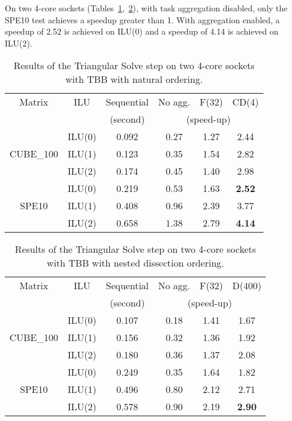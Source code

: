 On two 4-core sockets
(Tables~\ref{tab:tbb:8:solve:no},~\ref{tab:tbb:8:solve:nested}), with
task aggregation disabled, only the SPE10 test achieves a speedup
greater than 1. With aggregation enabled, a speedup of 2.52 is
achieved on ILU(0) and a speedup of 4.14 is achieved on ILU(2).

\begin{table}[!h]
  \renewcommand{\arraystretch}{1.3}
  \caption{Results of the Triangular Solve step on two 4-core sockets with
    TBB with natural ordering.}
  \label{tab:tbb:8:solve:no}
  \centering
  \begin{tabular}{|c|c||c|c|c|c|}
    \hline
    Matrix & ILU & Sequential & No agg. & F(32) & CD(4)\\
    &     &  (second)  & \multicolumn{3}{c|}{(speed-up)}\\
    \hline
    \hline
    & ILU(0) & 0.092 & 0.27 & 1.27 & 2.44\\
    CUBE\_100 & ILU(1) & 0.123 & 0.35 & 1.54 & 2.82\\
    & ILU(2) & 0.174 & 0.45 & 1.40 & 2.98\\
    \hline
    & ILU(0) & 0.219 & 0.53 & 1.63 & {\bf 2.52}\\
    SPE10     & ILU(1) & 0.408 & 0.96 & 2.39 & 3.77\\
    & ILU(2) & 0.658 & 1.38 & 2.79 & {\bf 4.14}\\
    \hline
  \end{tabular}
\end{table}


\begin{table}[!h]
  \renewcommand{\arraystretch}{1.3}
  \caption{Results of the Triangular Solve step on two 4-core
    sockets with TBB with nested dissection ordering.}
  \label{tab:tbb:8:solve:nested}
  \centering
  \begin{tabular}{|c|c||c|c|c|c|}
    \hline
    Matrix & ILU & Sequential & No agg. & F(32) & D(400)\\
    &     &  (second)  & \multicolumn{3}{c|}{(speed-up)}\\
    \hline
    \hline
    & ILU(0) & 0.107 & 0.18 & 1.41 & 1.67\\
    CUBE\_100 & ILU(1) & 0.156 & 0.32 & 1.36 & 1.92\\
    & ILU(2) & 0.180 & 0.36 & 1.37 & 2.08\\
    \hline
    & ILU(0) & 0.249 & 0.35 & 1.64 & 1.82\\
    SPE10     & ILU(1) & 0.496 & 0.80 & 2.12 & 2.71\\
    & ILU(2) & 0.578 & 0.90 & 2.19 & {\bf 2.90}\\
    \hline
  \end{tabular}
\end{table}


